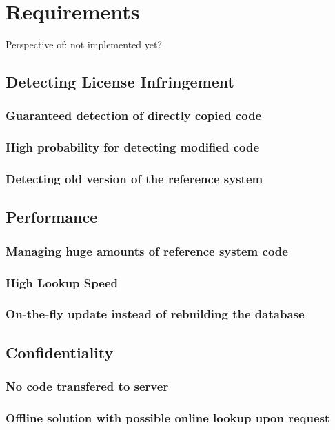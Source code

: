 
\chapter{Requirements}\label{chapter:requirements}
Perspective of: not implemented yet?

\section{Detecting License Infringement}
\subsection{Guaranteed detection of directly copied code}
\subsection{High probability for detecting modified code} %
\subsection{Detecting old version of the reference system}

\section{Performance}
\subsection{Managing huge amounts of reference system code}
\subsection{High Lookup Speed}
\subsection{On-the-fly update instead of rebuilding the database}

\section{Confidentiality}
\subsection{No code transfered to server}
\subsection{Offline solution with possible online lookup upon request}